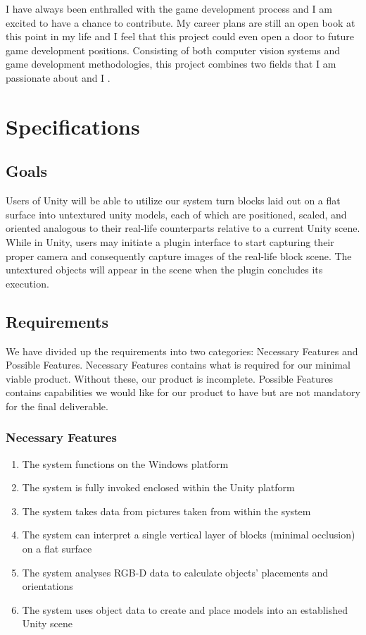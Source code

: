 \documentclass[12pt]{article}
\providecommand{\tightlist}{%
  \setlength{\itemsep}{0pt}\setlength{\parskip}{0pt}}
\begin{document}
I have always been enthralled with the game development process and I am
excited to have a chance to contribute. My career plans are still an
open book at this point in my life and I feel that this project could
even open a door to future game development positions. Consisting of
both computer vision systems and game development methodologies, this
project combines two fields that I am passionate about and I .

\section{Specifications}\label{specifications}

\subsection{Goals}\label{goals}

Users of Unity will be able to utilize our system turn blocks laid out
on a flat surface into untextured unity models, each of which are
positioned, scaled, and oriented analogous to their real-life
counterparts relative to a current Unity scene. While in Unity, users
may initiate a plugin interface to start capturing their proper camera
and consequently capture images of the real-life block scene. The
untextured objects will appear in the scene when the plugin concludes
its execution.

\subsection{Requirements}\label{requirements}

We have divided up the requirements into two categories: Necessary
Features and Possible Features. Necessary Features contains what is
required for our minimal viable product. Without these, our product is
incomplete. Possible Features contains capabilities we would like for
our product to have but are not mandatory for the final deliverable.

\subsubsection{Necessary Features}\label{necessary-features}

\begin{enumerate}
\def\labelenumi{\arabic{enumi}.}
\tightlist
\item
  The system functions on the Windows platform
\item
  The system is fully invoked enclosed within the Unity platform
\item
  The system takes data from pictures taken from within the system
\item
  The system can interpret a single vertical layer of blocks (minimal
  occlusion) on a flat surface
\item
  The system analyses RGB-D data to calculate objects' placements and
  orientations
\item
  The system uses object data to create and place models into an
  established Unity scene
\end{enumerate}
\end{document}
